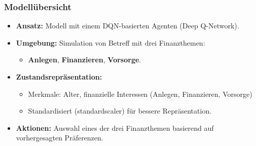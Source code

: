 \documentclass{beamer}
\begin{document}
\begin{frame}
    \label{sec5}
    \frametitle{Modellübersicht}

    \begin{itemize}
        \item \textbf{Ansatz:} Modell mit einem DQN-basierten Agenten (Deep Q-Network).
        \item \textbf{Umgebung:} Simulation von Betreff mit drei Finanzthemen:
        \begin{itemize}
            \item \textbf{Anlegen}, \textbf{Finanzieren}, \textbf{Vorsorge}.
        \end{itemize}
        \item \textbf{Zustandsrepräsentation:}
        \begin{itemize}
            \item Merkmale: Alter, finanzielle Interessen (Anlegen, Finanzieren, Vorsorge)           
            \item  Standardisiert (standardscaler) für bessere Repräsentation.
        \end{itemize}
        \item \textbf{Aktionen:} Auswahl eines der drei Finanzthemen basierend auf vorhergesagten Präferenzen.
    \end{itemize}
\end{frame}
\end{document}

